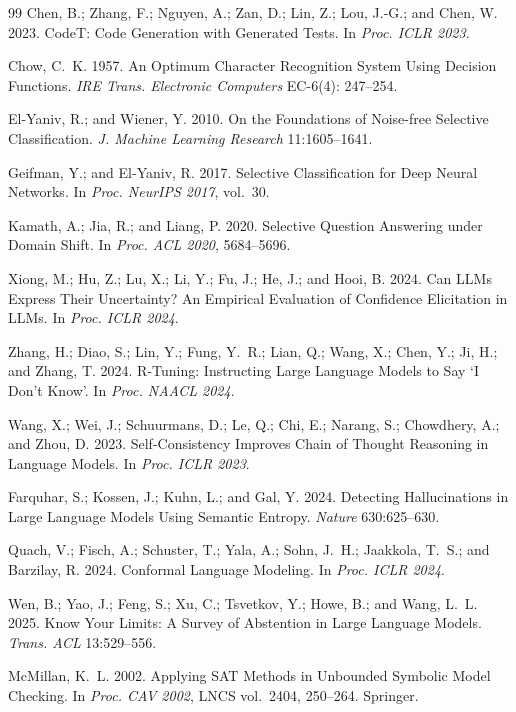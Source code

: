 \documentclass[letterpaper]{article}
\begin{document}
\begin{thebibliography}{99}
Chen, B.; Zhang, F.; Nguyen, A.; Zan, D.; Lin, Z.; Lou, J.-G.; and
Chen, W. 2023.
CodeT: Code Generation with Generated Tests.
In \textit{Proc. ICLR 2023}.

Chow, C.~K. 1957.
An Optimum Character Recognition System Using Decision Functions.
\textit{IRE Trans. Electronic Computers} EC-6(4): 247--254.

El-Yaniv, R.; and Wiener, Y. 2010.
On the Foundations of Noise-free Selective Classification.
\textit{J. Machine Learning Research} 11:1605--1641.

Geifman, Y.; and El-Yaniv, R. 2017.
Selective Classification for Deep Neural Networks.
In \textit{Proc. NeurIPS 2017}, vol.~30.

Kamath, A.; Jia, R.; and Liang, P. 2020.
Selective Question Answering under Domain Shift.
In \textit{Proc. ACL 2020}, 5684--5696.

Xiong, M.; Hu, Z.; Lu, X.; Li, Y.; Fu, J.; He, J.; and Hooi, B. 2024.
Can LLMs Express Their Uncertainty? An Empirical Evaluation of Confidence
Elicitation in LLMs. In \textit{Proc. ICLR 2024}.

Zhang, H.; Diao, S.; Lin, Y.; Fung, Y.~R.; Lian, Q.; Wang, X.; Chen, Y.;
Ji, H.; and Zhang, T. 2024.
R-Tuning: Instructing Large Language Models to Say `I Don't Know'.
In \textit{Proc. NAACL 2024}.

Wang, X.; Wei, J.; Schuurmans, D.; Le, Q.; Chi, E.; Narang, S.;
Chowdhery, A.; and Zhou, D. 2023.
Self-Consistency Improves Chain of Thought Reasoning in Language Models.
In \textit{Proc. ICLR 2023}.

Farquhar, S.; Kossen, J.; Kuhn, L.; and Gal, Y. 2024.
Detecting Hallucinations in Large Language Models Using Semantic Entropy.
\textit{Nature} 630:625--630.

Quach, V.; Fisch, A.; Schuster, T.; Yala, A.; Sohn, J.~H.;
Jaakkola, T.~S.; and Barzilay, R. 2024.
Conformal Language Modeling. In \textit{Proc. ICLR 2024}.

Wen, B.; Yao, J.; Feng, S.; Xu, C.; Tsvetkov, Y.; Howe, B.; and
Wang, L.~L. 2025.
Know Your Limits: A Survey of Abstention in Large Language Models.
\textit{Trans. ACL} 13:529--556.

McMillan, K.~L. 2002.
Applying SAT Methods in Unbounded Symbolic Model Checking.
In \textit{Proc. CAV 2002}, LNCS vol.~2404, 250--264. Springer.


\end{thebibliography}
\end{document}
